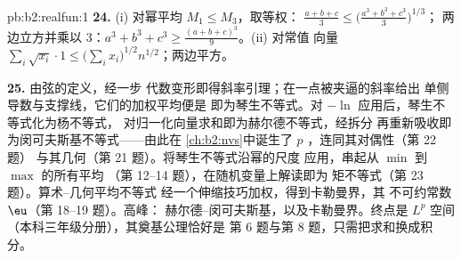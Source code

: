 \begin{solution}{pb:b2:realfun:1}
\textbf{24.} (i) 对幂平均 $M_1 \leq M_3$，取等权：
$\frac{a+b+c}3 \leq \bigl(\frac{a^3+b^3+c^3}3\bigr)^{1/3}$；
两边立方并乘以 $3$：$a^3 + b^3 + c^3 \geq
\frac{(a+b+c)^3}9$。(ii) 对常值
向量 $\sum_i\sqrt{x_i}\cdot1 \leq
\bigl(\sum_ix_i\bigr)^{1/2}n^{1/2}$；两边平方。

\textbf{25.} 由弦的定义，经一步
代数变形即得斜率引理；在一点被夹逼的斜率给出
单侧导数与支撑线，它们的加权平均便是
即为琴生不等式。对 $-\ln$ 应用后，琴生不等式化为杨不等式，
对归一化向量求和即为赫尔德不等式，经拆分
再重新吸收即为闵可夫斯基不等式——由此在
\cref{ch:b2:nvs}中诞生了 $p$ ，连同其对偶性（第 22 题）
与其几何（第 21 题）。将琴生不等式沿幂的尺度
应用，串起从 $\min$ 到 $\max$ 的所有平均
（第 12--14 题），在随机变量上解读即为
矩不等式（第 23 题）。算术–几何平均不等式
经一个伸缩技巧加权，得到卡勒曼界，其
不可约常数 $\eu$（第 18--19 题）。高峰：
赫尔德–闵可夫斯基，以及卡勒曼界。终点是 $L^p$
空间（本科三年级分册），其奠基公理恰好是
第 6 题与第 8 题，只需把求和换成积分。
\end{solution}
